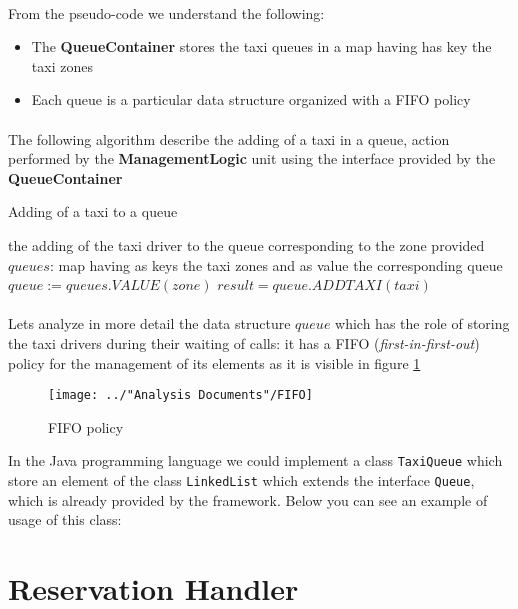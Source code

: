 \paragraph{}From the pseudo-code we understand the following:
\begin{itemize}
	\item The \textbf{QueueContainer} stores the taxi queues in a map having has key the taxi zones
	\item Each queue is a particular data structure organized with a FIFO policy
\end{itemize}
\paragraph{} The following algorithm describe the adding of a taxi in a queue, action performed by the \textbf{ManagementLogic} unit using the interface provided by the \textbf{QueueContainer}
\begin{algorithm}
\caption{Adding of a taxi to a queue}
\begin{algorithmic} \label{alg:addingOfATaxi}
\ENSURE the adding of the taxi driver to the queue corresponding to the zone provided
\linebreak
\STATE $queues$: map having as keys the taxi zones and as value the corresponding queue \linebreak
$queue:= queues.VALUE(zone)$  \linebreak
$result = queue.ADDTAXI(taxi)$ 
\RETURN
\end{algorithmic}
\end{algorithm}
\paragraph{}Lets analyze in more detail the data structure $queue$ which has the role of storing the taxi drivers during their waiting of calls: it has a FIFO (\textit{first-in-first-out}) policy for the management of its elements as it is visible in figure \ref{fig:FIFOpolicy}
\begin{figure}[H]
	\centering
	\texttt{[image: ../"Analysis Documents"/FIFO]}
	\caption{FIFO policy}
	\label{fig:FIFOpolicy}
\end{figure}
In the Java programming language we could implement a class \texttt{TaxiQueue} which store an element of the class \texttt{LinkedList} which extends the interface \texttt{Queue}, which is already provided by the framework. Below you can see an example of usage of this class:



\section{Reservation Handler}\label{alg:reservationHandler}